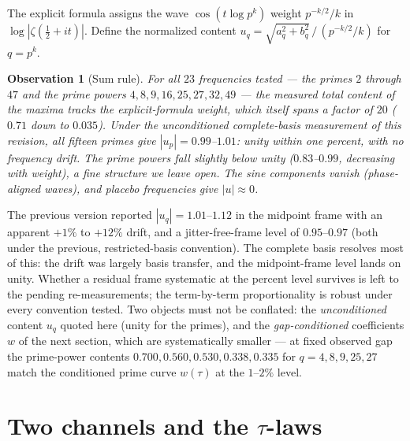 \documentclass[12pt]{amsart}
\newtheorem{observation}{Observation}
\begin{document}
The explicit formula assigns the wave $\cos(t \log p^k)$ weight
$p^{-k/2}/k$ in $\log|\zeta(\tfrac12+it)|$. Define the normalized content
$u_q = \sqrt{a_q^2 + b_q^2} \,/\, (p^{-k/2}/k)$ for $q = p^k$.

\begin{observation}[Sum rule]
For all $23$ frequencies tested --- the primes $2$ through $47$ and the
prime powers $4, 8, 9, 16, 25, 27, 32, 49$ --- the measured total
content of the maxima tracks the explicit-formula weight, which itself
spans a factor of $20$ ($0.71$ down to $0.035$). Under the unconditioned
complete-basis measurement of this revision, all fifteen primes give
$|u_p| = 0.99$--$1.01$: unity within one percent, with no frequency
drift. The prime powers fall slightly below unity ($0.83$--$0.99$,
decreasing with weight), a fine structure we leave open. The sine
components vanish (phase-aligned waves), and placebo frequencies give
$|u| \approx 0$.
\end{observation}

The previous version reported $|u_q| = 1.01$--$1.12$ in the midpoint
frame with an apparent $+1\%$ to $+12\%$ drift, and a
jitter-free-frame level of $0.95$--$0.97$ (both under the previous,
restricted-basis convention). The complete basis resolves most of this:
the drift was largely basis transfer, and the midpoint-frame level lands
on unity. Whether a residual frame systematic at the percent level
survives is left to the pending re-measurements; the term-by-term
proportionality is robust under every convention tested. Two objects
must not be conflated: the \emph{unconditioned} content $u_q$ quoted
here (unity for the primes), and the \emph{gap-conditioned}
coefficients $w$ of the next section, which are systematically smaller
--- at fixed observed gap the prime-power contents
$0.700, 0.560, 0.530, 0.338, 0.335$ for $q = 4, 8, 9, 25, 27$ match the
conditioned prime curve $w(\tau)$ at the $1$--$2\%$ level.

\section{Two channels and the $\tau$-laws}
\end{document}
